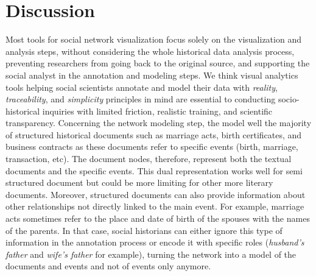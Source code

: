 \section{Discussion}


Most tools for social network visualization focus solely on the visualization and analysis steps, without considering the whole historical data analysis process, preventing researchers from going back to the original source, and supporting the social analyst in the annotation and modeling steps.
We think visual analytics tools helping social scientists annotate and model their data with \textit{reality}, \textit{traceability}, and \textit{simplicity} principles in mind are essential to conducting socio-historical inquiries with limited friction, realistic training, and scientific transparency.
Concerning the network modeling step, the \modelplural model well the majority of structured historical documents such as marriage acts, birth certificates, and business contracts as these documents refer to specific events (birth, marriage, transaction, etc). The document nodes, therefore, represent both the textual documents and the specific events.
This dual representation works well for semi structured document but could be more limiting for other more literary documents.
Moreover, structured documents can also provide information about other relationships not directly linked to the main event. For example, marriage acts sometimes refer to the place and date of birth of the spouses with the names of the parents.
In that case, social historians can either ignore this type of information in the annotation process or encode it with specific roles (\textit{husband's father} and \textit{wife's father} for example), turning the network into a model of the documents and events and not of events only anymore.


